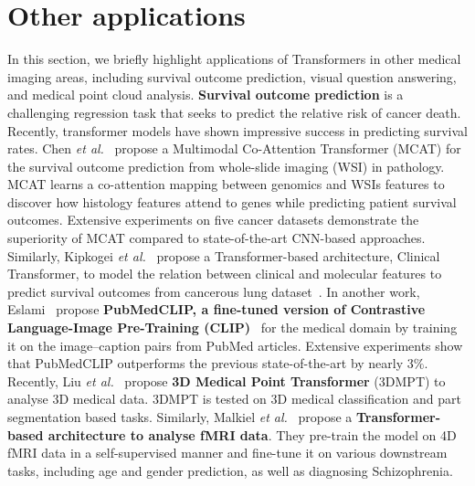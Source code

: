 \documentclass[10pt,journal,compsoc]{IEEEtran}
\begin{document}
\section{Other applications} \label{sec:other_app}
In this section, we briefly highlight applications of Transformers in other medical imaging areas, including survival outcome prediction, visual question answering, and medical point cloud analysis. 
\textbf{Survival outcome prediction} is a challenging regression task that seeks to predict the relative risk of cancer death. Recently, transformer models have shown impressive success in predicting survival rates. Chen \textit{et al.}~\cite{chen2021multimodal} propose a Multimodal Co-Attention Transformer (MCAT) for the survival outcome prediction from whole-slide imaging (WSI) in pathology. MCAT learns a co-attention mapping between genomics and WSIs features to discover how histology features attend to genes while predicting patient survival outcomes. Extensive experiments on five cancer datasets demonstrate the superiority of MCAT compared to state-of-the-art CNN-based approaches. Similarly, Kipkogei \textit{et al.}~\cite{kipkogei2021explainable} propose a Transformer-based architecture, Clinical Transformer, to model the relation between clinical and molecular features to predict survival outcomes from cancerous lung dataset~\cite{samstein2019tumor}.
In another work, Eslami~\cite{eslami2021does}  propose \textbf{PubMedCLIP, a fine-tuned version of Contrastive Language-Image Pre-Training (CLIP)}~\cite{radford2021learning} for the medical domain by training it on the image–caption pairs from PubMed articles. Extensive experiments show that PubMedCLIP outperforms the previous state-of-the-art by nearly 3$\%$.
Recently, Liu \textit{et al.}~\cite{liu2019deep} propose \textbf{3D Medical Point Transformer} (3DMPT) to analyse 3D medical data. 3DMPT is tested on 3D medical classification and part segmentation based tasks.
Similarly, Malkiel \textit{et al.}~\cite{malkiel2021pre} propose a \textbf{Transformer-based architecture to analyse fMRI data}. They pre-train the model on 4D fMRI data in a self-supervised manner and fine-tune it on various downstream tasks, including age and gender prediction, as well as diagnosing Schizophrenia.
\end{document}
